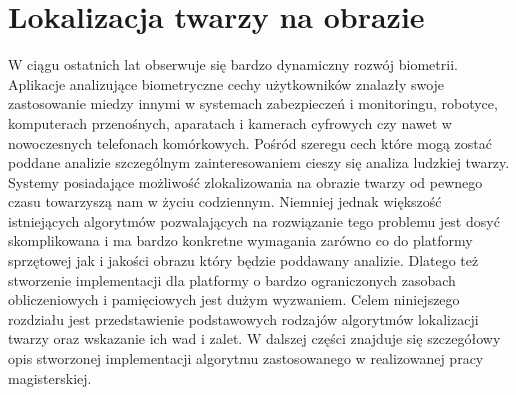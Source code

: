 \section{Lokalizacja twarzy na obrazie}
W ciągu ostatnich lat obserwuje się bardzo dynamiczny rozwój biometrii.
Aplikacje analizujące biometryczne cechy użytkowników znalazły swoje
zastosowanie miedzy innymi w systemach zabezpieczeń i monitoringu, robotyce,
komputerach przenośnych, aparatach i kamerach cyfrowych czy nawet w nowoczesnych
telefonach komórkowych. Pośród szeregu cech które mogą zostać poddane analizie
szczególnym zainteresowaniem cieszy się analiza ludzkiej twarzy. Systemy
posiadające możliwość zlokalizowania na obrazie twarzy od pewnego czasu
towarzyszą nam w życiu codziennym. Niemniej jednak większość istniejących
algorytmów pozwalających na rozwiązanie tego problemu jest
dosyć skomplikowana i ma bardzo konkretne wymagania zarówno co do platformy sprzętowej
jak i jakości obrazu który będzie poddawany analizie. Dlatego też stworzenie
implementacji dla platformy o bardzo ograniczonych zasobach obliczeniowych i
pamięciowych jest dużym wyzwaniem. Celem niniejszego rozdziału jest
przedstawienie podstawowych rodzajów algorytmów lokalizacji twarzy oraz
wskazanie ich wad i zalet. W dalszej części znajduje się szczegółowy opis
stworzonej implementacji algorytmu zastosowanego w realizowanej pracy magisterskiej.

